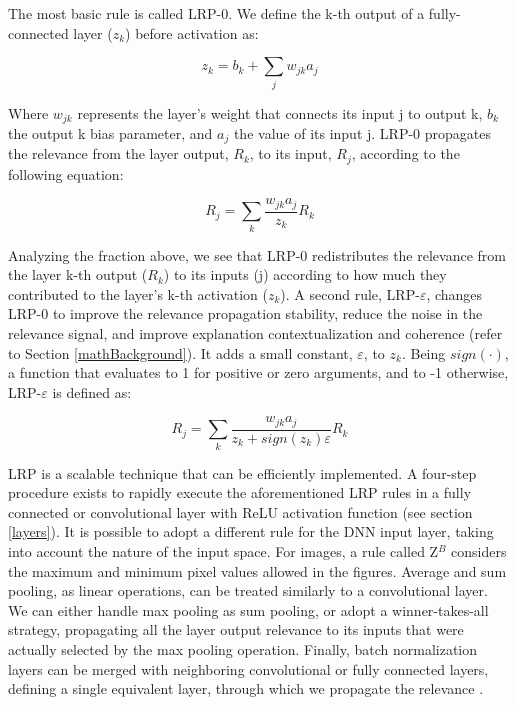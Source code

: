 \documentclass[fleqn,10pt]{wlscirep}
\begin{document}
{The most basic rule is called LRP-0. We define the k-th output of a fully-connected layer ($z_{k}$) before activation as:

\begin{equation}
z_{k}=b_{k}+\sum_{j} w_{jk}a_{j}
\end{equation}

Where $w_{jk}$ represents the layer's weight that connects its input j to output k, $b_{k}$ the output k bias parameter, and $a_{j}$ the value of its input j. LRP-0 propagates the relevance from the layer output, $R_{k}$, to its input, $R_{j}$, according to the following equation\cite{LRPBook}:

\begin{equation}
\label{LRP0}
R_{j}=\sum_{k}\frac{w_{jk}a_{j}}{z_{k}}R_{k}
\end{equation}

Analyzing the fraction above, we see that LRP-0 redistributes the relevance from the layer k-th output ($R_{k}$) to its inputs (j) according to how much they contributed to the layer's k-th activation ($z_{k}$). A second rule, LRP-$\varepsilon$, changes LRP-0 to improve the relevance propagation stability, reduce the noise in the relevance signal, and improve explanation contextualization and coherence (refer to Section \ref{mathBackground}). It adds a small constant, $\varepsilon$, to $z_{k}$. Being $sign(\cdot)$, a function that evaluates to 1 for positive or zero arguments, and to -1 otherwise, LRP-$\varepsilon$ is defined as:

\begin{equation}
\label{LRPeEquation}
R_{j}=\sum_{k}\frac{w_{jk}a_{j}}{z_{k}+sign(z_{k})\varepsilon}R_{k}
\end{equation}

LRP is a scalable technique that can be efficiently implemented. A four-step procedure exists to rapidly execute the aforementioned LRP rules in a fully connected or convolutional layer with ReLU activation function\cite{LRPBook} (see section \ref{layers}). It is possible to adopt a different rule for the DNN input layer, taking into account the nature of the input space. For images, a rule called Z$^{B}$\cite{LRPBook} considers the maximum and minimum pixel values allowed in the figures. Average and sum pooling, as linear operations, can be treated similarly to a convolutional layer. We can either handle max pooling as sum pooling, or adopt a winner-takes-all strategy, propagating all the layer output relevance to its inputs that were actually selected by the max pooling operation. Finally, batch normalization layers can be merged with neighboring convolutional or fully connected layers, defining a single equivalent layer, through which we propagate the relevance \cite{BNLRP}.

}
\end{document}
